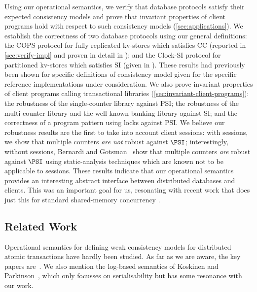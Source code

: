 {Using our operational semantics, we verify 
that database protocols satisfy their expected consistency models and
prove that invariant properties of client programs hold with respect to such
consistency models (\cref{sec:applications}).
We establish the correctness of two database
protocols using our general definitions: the COPS protocol for  fully replicated kv-stores \cite{cops} 
which satisfies CC (reported in \cref{sec:verify-impl}
and proven in  detail in \cite{shale-phd}); 
and the Clock-SI protocol for partitioned kv-stores \cite{clocksi} 
which satisfies SI  (given in \cite{shale-phd}). These results had previously been shown for
specific definitions of consistency model given for the specific reference
implementations under consideration.
We also prove invariant properties of client programs calling
transactional libraries (\cref{sec:invariant-client-programs}): the robustness of the single-counter library
against PSI;  the robustness of the multi-counter library and the
well-known banking library \cite{bank-example-wsi} against SI; and the
correctness of a program pattern using locks against PSI. 
We believe our robustness results are the first to take into account client
sessions: with sessions, we show that multiple counters {\em are not} robust against \(\PSI\);
interestingly, without sessions, Bernardi and Gotsman~\citet{giovanni_concur16} show that multiple counters \emph{are}
robust against \(\PSI\) using static-analysis techniques which are
known not to be applicable to sessions.  
These results indicate that  our operational semantics provides an interesting  abstract interface
between distributed databases and clients.
This was an important goal for us, resonating with recent work
that does just this for standard shared-memory concurrency \cite{tada,cap,iris,fcsl}. 



\subsection{Related Work} 
\label{sec:newrelated}

Operational semantics for defining weak consistency models for
distributed atomic transactions have  hardly been
studied. As far as we are aware, the key papers
are~\cite{seebelieve,sureshConcur,alonetogether}. 
We also mention the log-based semantics of Koskinen and Parkinson~\citet{push-pull},
which only focusses on serialisability but has some resonance with our
work. 



}
